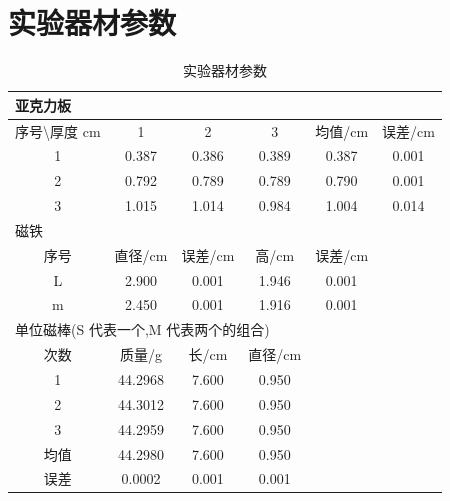 \documentclass[AutoFakeBold]{LZUThesis}
\begin{document}
\section{实验器材参数}
\label{参数}
\begin{table}[H]
    \centering

    \caption{实验器材参数}
    \begin{tabular}{cccccc} %
        \toprule
        \multicolumn{6}{l}{亚克力板}      \\
        \midrule             
        序号\textbackslash{}厚度 cm & 1       & 2     & 3     & 均值/cm & 误差/cm \\
        1                       & 0.387   & 0.386 & 0.389 & 0.387 & 0.001 \\
        2                       & 0.792   & 0.789 & 0.789 & 0.790 & 0.001 \\
        3                       & 1.015   & 1.014 & 0.984 & 1.004 & 0.014 \\
        \toprule
        \multicolumn{6}{l}{磁铁}     \\
        \midrule                                      
        序号                      & 直径/cm   & 误差/cm & 高/cm  & 误差/cm &       \\
        L                       & 2.900   & 0.001 & 1.946 & 0.001 &       \\
        m                       & 2.450   & 0.001 & 1.916 & 0.001 &       \\
        \toprule
        \multicolumn{6}{l}{单位磁棒(S 代表一个,M 代表两个的组合)}   \\
        \midrule                     
        次数                      & 质量/g    & 长/cm  & 直径/cm &       &       \\
        1                       & 44.2968 & 7.600 & 0.950 &       &       \\
        2                       & 44.3012 & 7.600 & 0.950 &       &       \\
        3                       & 44.2959 & 7.600 & 0.950 &       &       \\
        均值                      & 44.2980 & 7.600 & 0.950 &       &       \\
        误差                      & 0.0002  & 0.001 & 0.001 &       &      \\
        \bottomrule
    \end{tabular}
    \label{实验器材参数}
\end{table}
\end{document}
